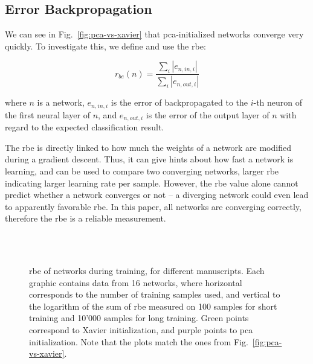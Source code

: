 \documentclass[conference]{IEEEtran}
\begin{document}
\subsection{Error Backpropagation}
We can see in Fig.~\ref{fig:pca-vs-xavier} that \ac{pca}-initialized networks converge very quickly.
To investigate this, we define and use the \ac{rbe}:

\begin{equation}
  r_{be}\left(n\right) = \frac{\sum_i \left|e_{n,in,i}\right|}{\sum_i \left|e_{n,out,i}\right|}
\end{equation}

\noindent where $n$ is a network, $e_{n,in,i}$ is the error of backpropagated to the $i$-th neuron of the first neural layer of $n$, and $e_{n,out,i}$ is the error of the output layer of $n$ with regard to the expected classification result.

The \ac{rbe} is directly linked to how much the weights of a network are modified during a gradient descent.
Thus, it can give hints about how fast a network is learning, and can be used to compare two converging networks, larger \ac{rbe} indicating larger learning rate per sample.
However, the \ac{rbe} value alone cannot predict whether a network converges or not -- a diverging network could even lead to apparently favorable \ac{rbe}.
In this paper, all networks are converging correctly, therefore the \ac{rbe} is a reliable measurement.

\begin{figure}[tb]
  \centering
  \hfill
   \\
  \hfill
  \hfill
   \\
  \hfill
  \hfill
  \caption{
    \acf{rbe} of networks during training, for different manuscripts.
    Each graphic contains data from 16 networks, where horizontal corresponds to the number of training samples used, and vertical to the logarithm of the sum of \ac{rbe} measured on 100 samples for short training and 10'000 samples for long training.
    Green points correspond to Xavier initialization, and purple points to \ac{pca} initialization.
    Note that the plots match the ones from Fig.~\ref{fig:pca-vs-xavier}.
  }
  \label{fig:rbe}
\end{figure}
\end{document}
